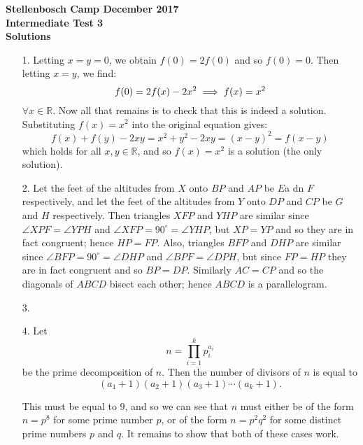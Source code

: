 \documentclass[a4paper,12pt]{article}
\begin{document}
\begin{center}
\textbf{Stellenbosch Camp December 2017 \\ Intermediate Test 3} \\
\textbf{Solutions}
\end{center}


\begin{enumerate}
    
    \item[1.] Letting $x=y=0$, we obtain $f(0) = 2f(0)$ and so $f(0)=0$. Then letting $x=y$, we find: 
    \begin{equation*}
    	f(0) = 2f(x)-2x^2 \\ \implies f(x) = x^2
    \end{equation*}
    $\forall x \in \mathbb{R}$. Now all that remains is to check that this is indeed a solution. Substituting $f(x)=x^2$ into the original equation gives:
    \begin{equation*}
    	f(x)+f(y)-2xy = x^2+y^2-2xy = (x-y)^2 = f(x-y)
    \end{equation*}
    which holds for all $x,y \in \mathbb{R}$, and so $f(x) = x^2$ is a solution (the only solution).
    
    
    \item[2.] Let the feet of the altitudes from $X$ onto $BP$ and $AP$ be $E$a dn $F$ respectively, and let the feet of the altitudes from $Y$ onto $DP$ and $CP$ be $G$ and $H$ respectively. Then triangles $XFP$ and $YHP$ are similar since $\angle XPF = \angle YPH$ and $\angle XFP = 90^\circ = \angle YHP$, but $XP = YP$ and so they are in fact congruent; hence $HP = FP$. Also, triangles $BFP$ and $DHP$ are similar since $\angle BFP = 90^\circ = \angle DHP$ and $\angle BPF = \angle DPH$, but since $FP = HP$ they are in fact congruent and so $BP = DP$. Similarly $AC = CP$ and so the diagonals of $ABCD$ bisect each other; hence $ABCD$ is a parallelogram.
    
    
    \item[3.] 
    
    
    \item[4.] Let
    \[
        n = \prod_{i=1}^{k} p_i^{a_i}
    \]
    be the prime decomposition of $n$. Then the number of divisors of $n$ is
    equal to
    \[
        (a_1 + 1)(a_2 + 1)(a_3 + 1) \cdots (a_k + 1).
    \]

    This must be equal to $9$, and so we can see that $n$ must either be of the
    form $n = p^8$ for some prime number $p$, or of the form $n = p^2 q^2$ for
    some distinct prime numbers $p$ and $q$. It remains to show that both of
    these cases work.


\end{enumerate}
\end{document}
